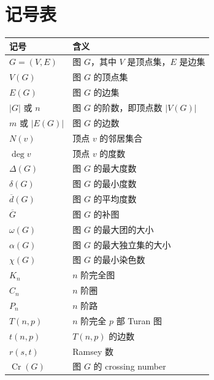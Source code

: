 \chapter*{记号表}

\begin{center}
\renewcommand{\arraystretch}{1.35}
\begin{tabular}{>{\centering\arraybackslash}p{}p{}}
\toprule
记号 & 含义 \\
\midrule
$G=(V,E)$ & 图 $G$，其中 $V$ 是顶点集，$E$ 是边集 \\
$V(G)$ & 图 $G$ 的顶点集 \\
$E(G)$ & 图 $G$ 的边集 \\
$|G|$ 或 $n$ & 图 $G$ 的阶数，即顶点数 $|V(G)|$ \\
$m$ 或 $|E(G)|$ & 图 $G$ 的边数 \\
$N(v)$ & 顶点 $v$ 的邻居集合 \\
$\deg v$ & 顶点 $v$ 的度数 \\
$\Delta(G)$ & 图 $G$ 的最大度数 \\
$\delta(G)$ & 图 $G$ 的最小度数 \\
$\overline{d}(G)$ & 图 $G$ 的平均度数 \\
$\overline{G}$ & 图 $G$ 的补图 \\
$\omega(G)$ & 图 $G$ 的最大团的大小 \\
$\alpha(G)$ & 图 $G$ 的最大独立集的大小 \\
$\chi(G)$ & 图 $G$ 的最小染色数 \\
$K_n$ & $n$ 阶完全图 \\
$C_n$ & $n$ 阶圈 \\
$P_n$ & $n$ 阶路 \\
$T(n,p)$ & $n$ 阶完全 $p$ 部 Turan 图 \\
$t(n,p)$ & $T(n,p)$ 的边数 \\
$r(s,t)$ & Ramsey 数 \\
$\operatorname{Cr}(G)$ & 图 $G$ 的 crossing number \\
\bottomrule
\end{tabular}
\end{center}
